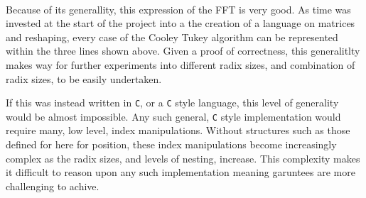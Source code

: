 \begin{AgdaSuppressSpace}
\begin{code}
\AgdaSpace{}%
\AgdaSymbol{)}\<%
\\
%
\>[6]%
\>[10]\AgdaSpace{}%
\AgdaSpace{}%
\<%
\end{code}
\begin{code}[hide]%
%
\>[6]\<%
\\
\>[6][@{}l@{\AgdaIndent{0}}]%
\>[8]\<%
\\
\>[8][@{}l@{\AgdaIndent{0}}]%
\>[10]\<%
\\
\>[10][@{}l@{\AgdaIndent{0}}]%
\>[12]\AgdaPostulate{\AgdaUnderscore{}}\AgdaSpace{}%
\AgdaSymbol{:}\AgdaSpace{}%
\AgdaSpace{}%
\<%
\\
%
\>[12]\AgdaPostulate{\AgdaUnderscore{}}\AgdaSpace{}%
\AgdaSymbol{:}\AgdaSpace{}%
\AgdaSpace{}%
\<%
\\
%
\>[12]\AgdaPostulate{\AgdaUnderscore{}}\AgdaSpace{}%
\AgdaSymbol{:}\AgdaSpace{}%
\AgdaSpace{}%
\AgdaSymbol{(}\AgdaSpace{}%
\AgdaSpace{}%
\AgdaSymbol{(}\AgdaSpace{}%
\AgdaSymbol{))}\<%
\end{code}
\end{AgdaSuppressSpace}

Because of its generallity, this expression of the FFT is very good. 
As time was invested at the start of the project into a the creation of a language 
on matrices and reshaping, every case of the Cooley Tukey algorithm can be 
represented within the three lines shown above. 
Given a proof of correctness, this generalitlty makes way for further experiments 
into different radix sizes, and combination of radix sizes, to be easily undertaken.

If this was instead written in \verb|C|, or a \verb|C| style language, this level
of generality would be almost impossible.
Any such general, \verb|C| style implementation would require many, low level,
index manipulations.
Without structures such as those defined for here for position, these index manipulations 
become increasingly complex as the radix sizes, and levels of nesting, increase.
This complexity makes it difficult to reason upon any such implementation meaning
garuntees are more challenging to achive.






